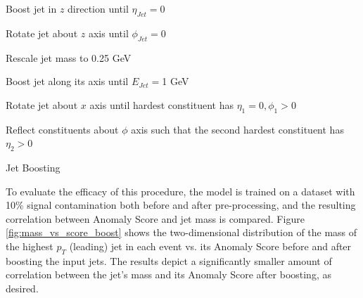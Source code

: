 \documentclass[12pt, a4paper]{article}
\begin{document}
\begin{algorithm}[H]
\SetAlgoLined
{}
  \Beginning{}

  Boost jet in $z$ direction until $\eta_{Jet} = 0$
 
  Rotate jet about $z$ axis until $\phi_{Jet} = 0$
 
  Rescale jet mass to 0.25 GeV
 
  Boost jet along its axis until $E_{Jet} = $1 GeV
 
  Rotate jet about $x$ axis until hardest constituent has $\eta_{1} = 0, \phi_{1} > 0$
 
 

 
Reflect constituents about $\phi$ axis such that the second hardest constituent has $\eta_{2} > 0$
 
\caption{Jet Boosting}
\label{alg:boost}
\end{algorithm}





To evaluate the efficacy of this procedure, the model is trained on a dataset with 10\% signal contamination both before and after pre-processing, and the resulting correlation between Anomaly Score and jet mass is compared. Figure \ref{fig:mass_vs_score_boost} shows the two-dimensional distribution of the mass of the highest $p_T$ (leading) jet in each event vs. its Anomaly Score before and after boosting the input jets. The results depict a significantly smaller amount of correlation between the jet's mass and its Anomaly Score after boosting, as desired.
\end{document}
